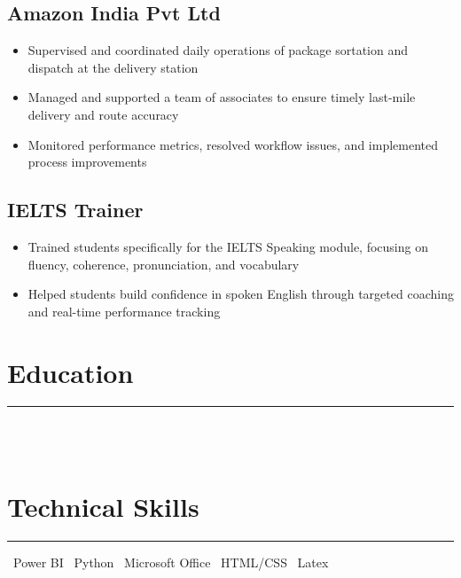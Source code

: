 \documentclass[12pt]{article}
\begin{document}
\subsection*{Amazon India Pvt Ltd}
\begin{itemize}
    \item Supervised and coordinated daily operations of package sortation and dispatch at the delivery station
    \item Managed and supported a team of associates to ensure timely last-mile delivery and route accuracy
    \item Monitored performance metrics, resolved workflow issues, and implemented process improvements
\end{itemize}

\subsection*{IELTS Trainer}
\begin{itemize}
    \item Trained students specifically for the IELTS Speaking module, focusing on fluency, coherence, pronunciation, and vocabulary
    \item Helped students build confidence in spoken English through targeted coaching and real-time performance tracking
\end{itemize}

\section*{\textbf{\large Education}}
\vspace{-2em}
\rule{\textwidth}{1pt}
\\[1em]
\\[1em]

\section*{\textbf{\large Technical Skills}}
\vspace{-2em}
\rule{\textwidth}{1pt}
\textbullet\ Power BI\quad
\textbullet\ Python \quad
\textbullet\ Microsoft Office \quad
\textbullet\ HTML/CSS \quad
\textbullet\ Latex
\end{document}
